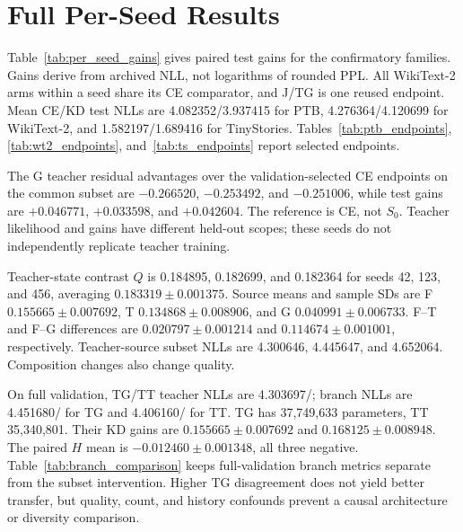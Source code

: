 \section{Full Per-Seed Results}\label{app:per-seed}



Table~\ref{tab:per_seed_gains} gives paired test gains for the confirmatory families. Gains derive from archived NLL, not logarithms of rounded PPL. All WikiText-2 arms within a seed share its CE comparator, and J/TG is one reused endpoint. Mean CE/KD test NLLs are 4.082352/3.937415 for PTB, 4.276364/4.120699 for WikiText-2, and 1.582197/1.689416 for TinyStories. Tables~\ref{tab:ptb_endpoints}, \ref{tab:wt2_endpoints}, and~\ref{tab:ts_endpoints} report selected endpoints.




The G teacher residual advantages over the validation-selected CE endpoints on the common subset are $-0.266520$, $-0.253492$, and $-0.251006$, while test gains are $+0.046771$, $+0.033598$, and $+0.042604$. The reference is CE, not $S_0$. Teacher likelihood and gains have different held-out scopes; these seeds do not independently replicate teacher training.

Teacher-state contrast $Q$ is 0.184895, 0.182699, and 0.182364 for seeds 42, 123, and 456, averaging $0.183319\pm0.001375$. Source means and sample SDs are F $0.155665\pm0.007692$, T $0.134868\pm0.008906$, and G $0.040991\pm0.006733$. F--T and F--G differences are $0.020797\pm0.001214$ and $0.114674\pm0.001001$, respectively. Teacher-source subset NLLs are 4.300646, 4.445647, and 4.652064. Composition changes also change quality.

On full validation, TG/TT teacher NLLs are 4.303697/; branch NLLs are 4.451680/ for TG and 4.406160/ for TT. TG has 37,749,633 parameters, TT 35,340,801. Their KD gains are $0.155665\pm0.007692$ and $0.168125\pm0.008948$. The paired $H$ mean is $-0.012460\pm0.001348$, all three negative. Table~\ref{tab:branch_comparison} keeps full-validation branch metrics separate from the subset intervention. Higher TG disagreement does not yield better transfer, but quality, count, and history confounds prevent a causal architecture or diversity comparison.

